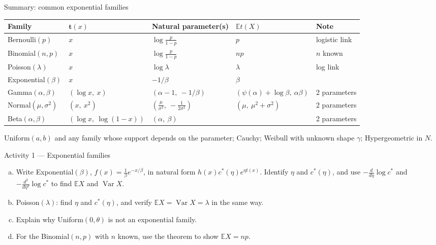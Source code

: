 \documentclass[aspectratio=169,t,10pt]{beamer}
\newcommand{\E}{\mathbb{E}}
\newcommand{\Var}{\operatorname{Var}}
\begin{document}
\begin{frame}{Summary: common exponential families}
  \small
  \renewcommand{\arraystretch}{1.4}
  \begin{center}
  \begin{tabular}{@{}lllll@{}}
  \textbf{Family}&$\boldsymbol t(x)$&\textbf{Natural parameter(s)}&$\E t(X)$&\textbf{Note}\\\hline
  Bernoulli$(p)$&$x$&$\log\frac p{1-p}$&$p$&logistic link\\
  Binomial$(n,p)$&$x$&$\log\frac p{1-p}$&$np$&$n$ known\\
  Poisson$(\lambda)$&$x$&$\log\lambda$&$\lambda$&log link\\
  Exponential$(\beta)$&$x$&$-1/\beta$&$\beta$&\\
  Gamma$(\alpha,\beta)$&$(\log x,\ x)$&$(\alpha-1,\ -1/\beta)$&$(\psi(\alpha)+\log\beta,\ \alpha\beta)$&2 parameters\\
  Normal$(\mu,\sigma^2)$&$(x,\ x^2)$&$(\frac\mu{\sigma^2},\ -\frac1{2\sigma^2})$&$(\mu,\ \mu^2+\sigma^2)$&2 parameters\\
  Beta$(\alpha,\beta)$&$(\log x,\ \log(1{-}x))$&$(\alpha,\ \beta)$&&2 parameters
  \end{tabular}
  \end{center}
  \vspace{-0.4em}
  \begin{tcolorbox}[mynote={Not exponential families}]\small
  Uniform$(a,b)$ and any family whose support depends on the parameter; Cauchy; Weibull with unknown shape $\gamma$; Hypergeometric in $N$.
  \end{tcolorbox}
\end{frame}

\begin{frame}[t]{Activity 1 --- Exponential families }
  \begin{tcolorbox}[myquiz={Problems}]\small
  \begin{enumerate}[(a)]
    \item Write Exponential$(\beta)$, $f(x)=\frac1\beta e^{-x/\beta}$, in natural form $h(x)c^*(\eta)e^{\eta t(x)}$. Identify $\eta$ and $c^*(\eta)$, and use $-\frac d{d\eta}\log c^*$ and $-\frac{d^2}{d\eta^2}\log c^*$ to find $\E X$ and $\Var X$.
    \item Poisson$(\lambda)$: find $\eta$ and $c^*(\eta)$, and verify $\E X=\Var X=\lambda$ in the same way.
    \item Explain why Uniform$(0,\theta)$ is not an exponential family.
    \item For the Binomial$(n,p)$ with $n$ known, use the theorem to show $\E X=np$.
  \end{enumerate}
  \end{tcolorbox}
\end{frame}
\end{document}
